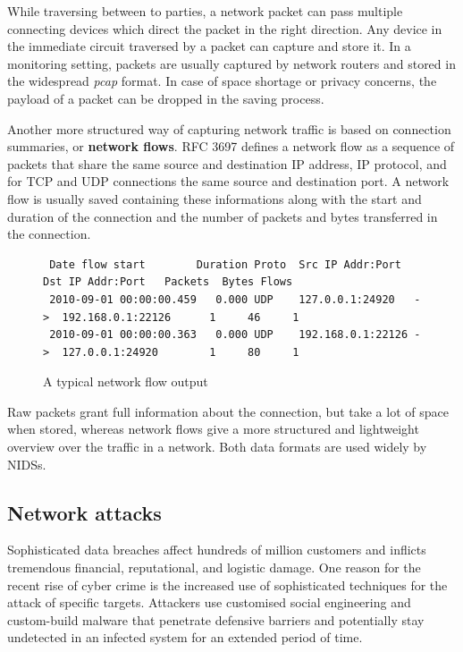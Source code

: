 While traversing between to parties, a network packet can pass multiple connecting devices which direct the packet in the right direction. Any device in the immediate circuit traversed by a packet can capture and store it. In a monitoring setting, packets are usually captured by network routers and stored in the widespread \textit{pcap} format. In case of space shortage or privacy concerns, the payload of a packet can be dropped in the saving process.


Another more structured way of capturing network traffic is based on connection summaries, or \textbf{network flows}. RFC 3697 \cite{brownlee1999traffic} defines a network flow as a sequence of packets that share the same source and destination IP address, IP protocol, and for TCP and UDP connections the same source and destination port. A network flow is usually saved containing these informations along with the start and duration of the connection and the number of packets and bytes transferred in the connection.


\begin{figure}[h!]
\scriptsize
\centering
\begin{verbatim}
 Date flow start        Duration Proto  Src IP Addr:Port      Dst IP Addr:Port   Packets  Bytes Flows
 2010-09-01 00:00:00.459   0.000 UDP    127.0.0.1:24920   ->  192.168.0.1:22126      1     46     1
 2010-09-01 00:00:00.363   0.000 UDP    192.168.0.1:22126 ->  127.0.0.1:24920        1     80     1
\end{verbatim}
\normalsize
\caption{A typical network flow output}
\end{figure}


Raw packets grant full information about the connection, but take a lot of space when stored, whereas network flows give a more structured and lightweight overview over the traffic in a network. Both data formats are used widely by NIDSs.

\subsection{Network attacks}

Sophisticated data breaches affect hundreds of million customers and inflicts tremendous financial, reputational, and logistic damage. %
One reason for the recent rise of cyber crime is the increased use of sophisticated techniques for the attack of specific targets. Attackers use customised social engineering and custom-build malware that penetrate defensive barriers and potentially stay undetected in an infected system for an extended period of time. 




